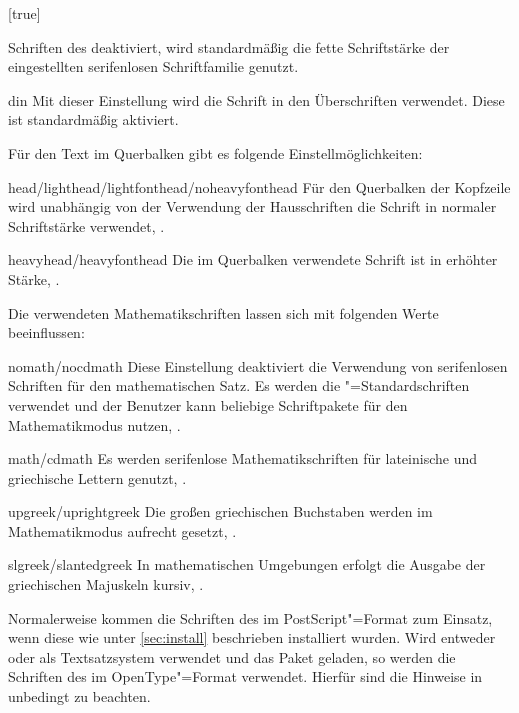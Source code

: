\begin{Declaration*}{}
\begin{Declaration*}{}
\begin{Declaration*}{}
\begin{Declaration}[%
  v2.02!\Option{cdfont=head};
  v2.02!\Option{cdfont=heavyhead};
  v2.03!\Option{cdfont=din};
  v2.03!\Option{cdfont=nodin};
]{}[true]
\begin{values}{}
  Schriften des \CDs deaktiviert, wird standardmäßig die fette Schriftstärke 
  der eingestellten serifenlosen Schriftfamilie genutzt.
\item[din]
  Mit dieser Einstellung wird die Schrift \DIN in den Überschriften verwendet. 
  Diese ist standardmäßig aktiviert.
\end{values}
%
Für den Text im Querbalken gibt es folgende Einstellmöglichkeiten:
%
\begin{values}{}
\item[head/lighthead/lightfonthead/noheavyfonthead]
  Für den Querbalken der Kopfzeile wird unabhängig von der Verwendung der 
  Hausschriften die Schrift \Univers in normaler Schriftstärke verwendet,
  .
\item[heavyhead/heavyfonthead]
  Die im Querbalken verwendete Schrift ist \Univers in erhöhter Stärke, 
  .
\end{values}
%
Die verwendeten Mathematikschriften lassen sich mit folgenden Werte 
beeinflussen:
%
\begin{values}{}
\item[nomath/nocdmath] 
  Diese Einstellung deaktiviert die Verwendung von serifenlosen Schriften für 
  den mathematischen Satz. Es werden die "=Standardschriften 
  verwendet und der Benutzer kann beliebige Schriftpakete für den 
  Mathematikmodus nutzen, .
\item[math/cdmath]
  Es werden serifenlose Mathematikschriften für lateinische und griechische 
  Lettern genutzt, .
\item[upgreek/uprightgreek]
  Die großen griechischen Buchstaben werden im Mathematikmodus aufrecht gesetzt,
  .
\item[slgreek/slantedgreek]
  In mathematischen Umgebungen erfolgt die Ausgabe der griechischen Majuskeln 
  kursiv, .
\end{values}
%
Normalerweise kommen die Schriften des \CDs im PostScript"=Format zum Einsatz, 
wenn diese wie unter \autoref{sec:install} beschrieben installiert wurden.
Wird entweder  oder  als Textsatzsystem 
verwendet und das Paket  geladen, so werden die Schriften des 
\CDs im OpenType"=Format verwendet. Hierfür sind die Hinweise in 
 unbedingt zu beachten.
\end{Declaration}



\end{Declaration*}
\end{Declaration*}
\end{Declaration*}
